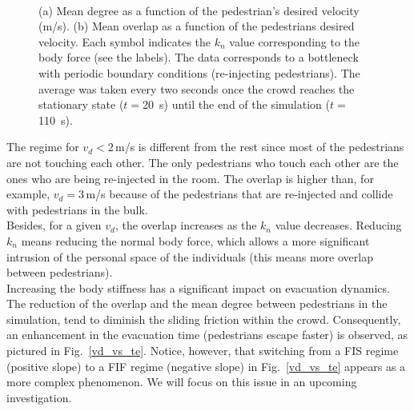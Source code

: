 \documentclass[preprint,12pt]{elsarticle}
\begin{document}
\begin{figure}[!htbp]
\centering
    \ 
    \\
\caption[width=0.47\columnwidth]{(a) Mean degree as a function of the pedestrian’s desired velocity (m/s). (b) Mean overlap as a function of the pedestrians desired velocity. Each symbol indicates the $k_n$ value corresponding to the body force (see the labels). The data corresponds to a bottleneck with periodic boundary conditions (re-injecting pedestrians). The average was taken every two seconds once the crowd reaches the stationary state ($t=$20~s) until the end of the simulation ($t=$110~s).}
\label{degree_overlap_vd}
\end{figure}

The regime for $v_d<2\,$m/s is different from the rest since most of the 
pedestrians are not touching each other. The only pedestrians who touch each 
other are the ones who are being re-injected in the room. The overlap is higher 
than, for example, $v_d=3\,$m/s because of the pedestrians that 
are re-injected and collide with pedestrians in the bulk. \\

Besides, for a given $v_d$, the overlap increases as the $k_n$ value decreases. 
Reducing $k_n$ means reducing the normal body force, which allows a more 
significant intrusion of the personal space of the individuals 
(this means more overlap between pedestrians).\\  


Increasing the body stiffness has a significant impact on 
evacuation dynamics. The reduction of the overlap and the mean degree between 
pedestrians in the simulation, tend to diminish the sliding 
friction within the crowd. Consequently, an enhancement in the evacuation time 
(pedestrians escape faster) is observed, as pictured in Fig.~\ref{vd_vs_te}. 
Notice, however, that switching from a FIS regime (positive slope) to a  FIF 
regime (negative slope) in Fig.~\ref{vd_vs_te} appears as a more complex 
phenomenon. We will focus on this issue in an upcoming investigation.\\
\end{document}
